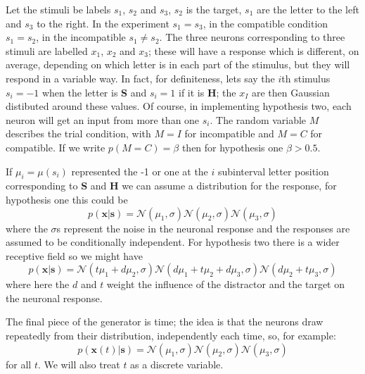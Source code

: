 \documentclass[12pt]{article}
\begin{document}
Let the stimuli be labels $s_1$, $s_2$ and $s_3$, $s_2$ is the target,
$s_1$ are the letter to the left and $s_3$ to the right. In the
experiment $s_1=s_3$, in the compatible condition $s_1=s_2$, in the
incompatible $s_1\not=s_2$. The three neurons corresponding to three
stimuli are labelled $x_1$, $x_2$ and $x_3$; these will have a
response which is different, on average, depending on which letter is
in each part of the stimulus, but they will respond in a variable
way. In fact, for definiteness, lets say the $i$th stimulus $s_i=-1$
when the letter is \textbf{S} and $s_i=1$ if it is \textbf{H}; the
$x_I$ are then Gaussian distibuted around these values. Of course, in
implementing hypothesis two, each neuron will get an input from more
than one $s_i$. The random variable $M$ describes the trial condition,
with $M=I$ for incompatible and $M=C$ for compatible. If we write
$p(M=C)=\beta$ then for hypothesis one $\beta>0.5$.

If $\mu_i=\mu(s_i)$ represented the -1 or one at the $i$ subinterval
letter position corresponding to \textbf{S} and \textbf{H} we can
assume a distribution for the response, for hypothesis one this could be
\begin{equation}
p(\textbf{x}|\textbf{s})=\mathcal{N}(\mu_1,\sigma)\mathcal{N}(\mu_2,\sigma)\mathcal{N}(\mu_3,\sigma)
\end{equation}
where the $\sigma$s represent the noise in the neuronal response and the responses are assumed to be conditionally independent. For hypothesis two there is a wider receptive field so we might have
\begin{equation}
p(\textbf{x}|\textbf{s})=\mathcal{N}(t\mu_1+d\mu_2,\sigma)\mathcal{N}(d\mu_1+t\mu_2+d\mu_3,\sigma)\mathcal{N}(d\mu_2+t\mu_3,\sigma)
\end{equation}
where here the $d$ and $t$ weight the influence of the distractor and
the target on the neuronal response.

The final piece of the generator is time; the idea is that the neurons
draw repeatedly from their distribution, independently each time, so, for example:
\begin{equation}
p(\textbf{x}(t)|\textbf{s})=\mathcal{N}(\mu_1,\sigma)\mathcal{N}(\mu_2,\sigma)\mathcal{N}(\mu_3,\sigma)
\end{equation}
for all $t$. We will also treat $t$ as a discrete variable.
\end{document}
